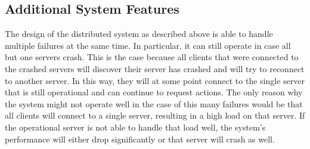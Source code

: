 \subsection{Additional System Features}
\label{subsec:additional_features}
The design of the distributed system as described above is able to handle multiple failures at the same time. 
In particular, it can still operate in case all but one servers crash. 
This is the case because all clients that were connected to the crashed servers will discover their server has crashed and will try to reconnect to another server.
In this way, they will at some point connect to the single server that is still operational and can continue to request actions.
The only reason why the system might not operate well in the case of this many failures would be that all clients will connect to a single server, resulting in a high load on that server.
If the operational server is not able to handle that load well, the system's performance will either drop significantly or that server will crash as well.

 
